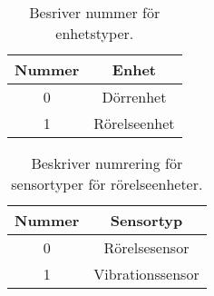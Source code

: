 \newpage
\begin{table}
	\centering
	\begin{tabular}{|c|c|}
		\hline
		Nummer & Enhet \\ \hline \hline
		0 & Dörrenhet \\ \hline
		1 & Rörelseenhet \\ \hline

	\end{tabular}
	\caption{Besriver nummer för enhetstyper.}
	\label{tab:enhetstyper}
\end{table}

\begin{table}
	\centering
	\begin{tabular}{|c|c|}
		\hline
		Nummer & Sensortyp \\ \hline \hline
		0 & Rörelsesensor \\ \hline
		1 & Vibrationssensor \\ \hline

	\end{tabular}
	\caption{Beskriver numrering för sensortyper för rörelseenheter.}
	\label{tab:sensortyper}
\end{table}
